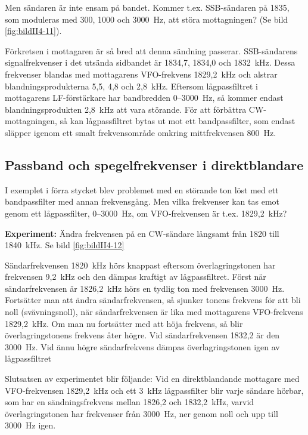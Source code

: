 Men sändaren är inte ensam på bandet.
Kommer t.ex. SSB-sändaren på 1835, som moduleras med 300, 1000 och 3000~Hz,
att störa mottagningen?
(Se bild \ref{fig:bildII4-11}).

Förkretsen i mottagaren är så bred att denna sändning passerar.
SSB-sändarens signalfrekvenser i det utsända sidbandet är 1834,7, 1834,0 och
1832~kHz.
Dessa frekvenser blandas med mottagarens VFO-frekvens 1829,2~kHz och alstrar
blandningsprodukterna 5,5, 4,8 och 2,8~kHz.
Eftersom lågpassfiltret i mottagarens LF-förstärkare har bandbredden
0--3000~Hz, så kommer endast blandningsprodukten 2,8~kHz att vara störande.
För att förbättra CW-mottagningen, så kan lågpassfiltret bytas ut mot ett
bandpassfilter, som endast släpper igenom ett smalt frekvensområde omkring
mittfrekvensen 800~Hz.

\subsection{Passband och spegelfrekvenser i direktblandare}

I exemplet i förra stycket blev problemet med en störande ton löst med
ett bandpassfilter med annan frekvensgång.
Men vilka frekvenser kan tas emot genom ett lågpassfilter, 0--3000~Hz,
om VFO-frekvensen är t.ex. 1829,2~kHz?

\textbf{Experiment:}
Ändra frekvensen på en CW-sändare långsamt från 1820 till 1840~kHz.
Se bild \ref{fig:bildII4-12}

Sändarfrekvensen 1820~kHz hörs knappast eftersom överlagringstonen har
frekvensen 9,2~kHz och den dämpas kraftigt av lågpassfiltret.
Först när sändarfrekvensen är 1826,2~kHz hörs en tydlig ton med frekvensen
3000~Hz.
Fortsätter man att ändra sändarfrekvensen, så sjunker tonens frekvens för att
bli noll (svävningsnoll), när sändarfrekvensen är lika med mottagarens
VFO-frekvens 1829,2~kHz.
Om man nu fortsätter med att höja frekvens, så blir överlagringstonens
frekvens åter högre.
Vid sändarfrekvensen 1832,2 är den 3000~Hz. Vid ännu högre sändarfrekvens
dämpas överlagringstonen igen av lågpassfiltret

Slutsatsen av experimentet blir följande:
Vid en direktblandande mottagare med VFO-frekvensen 1829,2~kHz och ett 3~kHz
lågpassfilter blir varje sändare hörbar, som har en sändningsfrekvens mellan
1826,2 och 1832,2~kHz, varvid överlagringstonen har frekvenser från 3000~Hz, ner
genom noll och upp till 3000~Hz igen.

